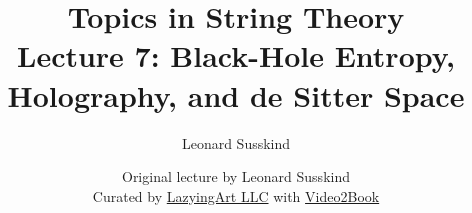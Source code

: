 \documentclass[11pt,oneside]{book}
\begin{document}
\frontmatter
\title{Topics in String Theory\\[0.45em]\large Lecture 7: Black-Hole Entropy, Holography, and de Sitter Space}
\author{Leonard Susskind}
\date{Original lecture by Leonard Susskind\\[0.35em]Curated by \href{https://lazying.art}{LazyingArt LLC} with \href{https://github.com/lachlanchen/Video2Book}{Video2Book}}
\maketitle
\mainmatter

\end{document}
